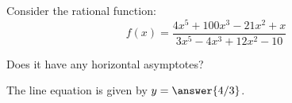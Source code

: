 \documentclass{ximera}
\author{Ivo Terek}
\begin{document}
\begin{exercise}

  Consider the rational function:
  $$  f(x) = \frac{4x^5+100x^3 - 21x^2+x}{3x^5-4x^3+12x^2-10}  $$

  Does it have any horizontal asymptotes?

  \begin{multipleChoice}
  \end{multipleChoice}

  \begin{exercise}
    The line equation is given by $y= \answer{4/3}$.
  \end{exercise}

\end{exercise}
\end{document}
